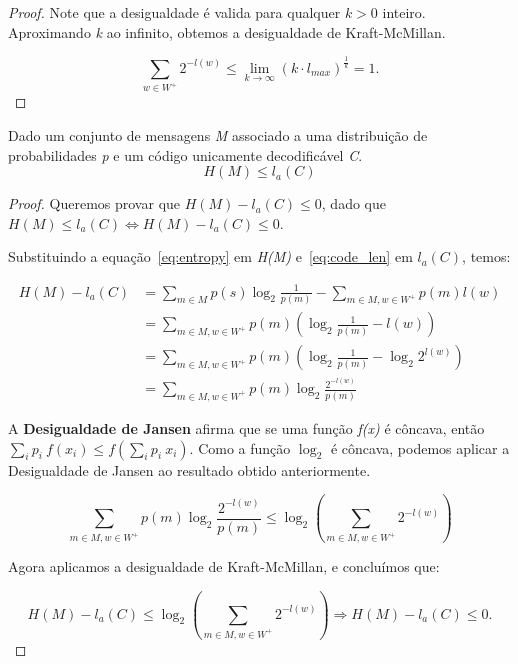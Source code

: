 \begin{lemma}
\begin{proof}
Note que a desigualdade é valida para qualquer $k > 0$ inteiro. Aproximando \emph{k} ao infinito, obtemos a desigualdade de Kraft-McMillan.

\begin{equation*}
\sum_{w \in W^+}^{}2^{-l(w)} \leq \lim_{k\to\infty} (k \cdot l_{max})^ \frac{1}{k} = 1.
\end{equation*}

\end{proof}
\end{lemma}

\begin{lemma} Dado um conjunto de mensagens \emph{M} associado a uma distribuição de probabilidades \emph{p} e um código unicamente decodificável \emph{C}.
\begin{equation*}
H(M) \leq l_a(C)
\end{equation*}

\begin{proof}
Queremos provar que $H(M) - l_a(C) \leq 0$, dado que  $H(M) \leq l_a(C) \Leftrightarrow H(M) - l_a(C) \leq 0$.

Substituindo a equação~\ref{eq:entropy} em \emph{H(M)} e~\ref{eq:code_len} em \emph{$l_a(C)$}, temos:

\begin{align*}
H(M) - l_a(C) &= \sum_{m \in M}^{}p(s) \log_2 \frac{1}{p(m)}  - \sum_{m \in M, w \in W^+}^{}p(m) l(w) \\
&= \sum_{m \in M, w \in W^+}^{}p(m) \left(  \log_2 \frac{1}{p(m)} - l(w) \right) \\
&= \sum_{m \in M, w \in W^+}^{}p(m) \left(  \log_2 \frac{1}{p(m)} - \log_2 2^{l(w)} \right) \\
&= \sum_{m \in M, w \in W^+}^{}p(m) \log_2 \frac{2^{-l(w)}}{p(m)}
\end{align*}

A \textbf{Desigualdade de Jansen} afirma que se uma função \emph{f(x)} é côncava, então $\sum_{i}{}p_i~f(x_i) \leq f(\sum_{i}{}p_i~x_i)$. Como a função $\log_2$ é côncava, podemos aplicar a Desigualdade de Jansen ao resultado obtido anteriormente.

\begin{equation*}
\sum_{m \in M, w \in W^+}^{}p(m) \log_2 \frac{2^{-l(w)}}{p(m)}  \leq \log_2(\sum_{m \in M, w \in W^+}{}2^{-l(w)})
\end{equation*}

Agora aplicamos a desigualdade de Kraft-McMillan, e concluímos que:

\begin{equation*}
H(M) - l_a(C) \leq \log_2(\sum_{m \in M, w \in W^+}{}2^{-l(w)}) \Rightarrow H(M) - l_a(C) \leq 0.
\end{equation*}


\end{proof}

\end{lemma}

